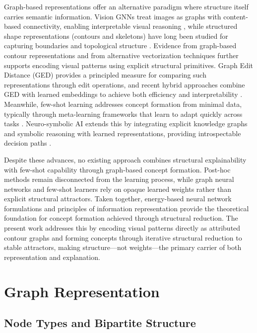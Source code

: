 \documentclass[runningheads]{llncs}
\begin{document}
Graph-based representations offer an alternative paradigm where structure itself carries semantic information. Vision GNNs treat images as graphs with content-based connectivity, enabling interpretable visual reasoning \cite{han2022vision}, while structured shape representations (contours and skeletons) have long been studied for capturing boundaries and topological structure \cite{chatbri2016comparative,shen2016shape}. Evidence from graph-based contour representations \cite{parzhin2013principles} and from alternative vectorization techniques \cite{parzhin2022vectorization} further supports encoding visual patterns using explicit structural primitives. Graph Edit Distance (GED) provides a principled measure for comparing such representations through edit operations, and recent hybrid approaches combine GED with learned embeddings to achieve both efficiency and interpretability \cite{wang2021combinatorial,liu2023mata}. Meanwhile, few-shot learning addresses concept formation from minimal data, typically through meta-learning frameworks that learn to adapt quickly across tasks \cite{finn2017model,snell2017prototypical}. Neuro-symbolic AI extends this by integrating explicit knowledge graphs and symbolic reasoning with learned representations, providing introspectable decision paths \cite{nawaz2025review,rajabi2024knowledge}.

Despite these advances, no existing approach combines structural explainability with few-shot capability through graph-based concept formation. Post-hoc methods remain disconnected from the learning process, while graph neural networks and few-shot learners rely on opaque learned weights rather than explicit structural attractors. Taken together, energy-based neural network formulations \cite{parzhyn2025energy} and principles of information representation \cite{parzhyn2025architecture} provide the theoretical foundation for concept formation achieved through structural reduction. The present work addresses this by encoding visual patterns directly as attributed contour graphs and forming concepts through iterative structural reduction to stable attractors, making structure—not weights—the primary carrier of both representation and explanation.

\section{Graph Representation}

\subsection{Node Types and Bipartite Structure}
\end{document}
